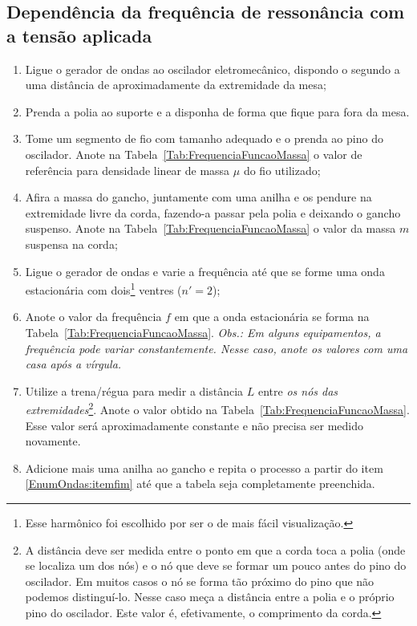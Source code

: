\subsection{Dependência da frequência de ressonância com a tensão aplicada}

\begin{enumerate}
\item Ligue o gerador de ondas ao oscilador eletromecânico, dispondo o segundo a uma distância de aproximadamente  da extremidade da mesa;\label{EnumOndas:iteminicio}
\item Prenda a polia ao suporte e a disponha de forma que fique para fora da mesa.
\item Tome um segmento de fio com tamanho adequado e o prenda ao pino do oscilador. Anote na Tabela~\ref{Tab:FrequenciaFuncaoMassa} o valor de referência para densidade linear de massa $\mu$ do fio utilizado;
\item Afira a massa do gancho, juntamente com uma anilha e os pendure na extremidade livre da corda, fazendo-a passar pela polia e deixando o gancho suspenso. Anote na Tabela~\ref{Tab:FrequenciaFuncaoMassa} o valor da massa $m$ suspensa na corda;\label{EnumOndas:itemfim}
\item Ligue o gerador de ondas e varie a frequência até que se forme uma onda estacionária com dois\footnote{Esse harmônico foi escolhido por ser o de mais fácil visualização.} ventres ($n' =2$);
\item Anote o valor da frequência $f$ em que a onda estacionária se forma na Tabela~\ref{Tab:FrequenciaFuncaoMassa}. \emph{Obs.: Em alguns equipamentos, a frequência pode variar constantemente. Nesse caso, anote os valores com uma casa após a vírgula.}
\item Utilize a trena/régua para medir a distância $L$ entre \emph{os nós das extremidades}\footnote{A distância deve ser medida entre o ponto em que a corda toca a polia (onde se localiza um dos nós) e o nó que deve se formar um pouco antes do pino do oscilador. Em muitos casos o nó se forma tão próximo do pino que não podemos distinguí-lo. Nesse caso meça a distância entre a polia e o próprio pino do oscilador. Este valor é, efetivamente, o comprimento da corda.}. Anote o valor obtido na Tabela~\ref{Tab:FrequenciaFuncaoMassa}. Esse valor será aproximadamente constante e não precisa ser medido novamente.
\item Adicione mais uma anilha ao gancho e repita o processo a partir do item \ref{EnumOndas:itemfim} até que a tabela seja completamente preenchida.
\end{enumerate}

